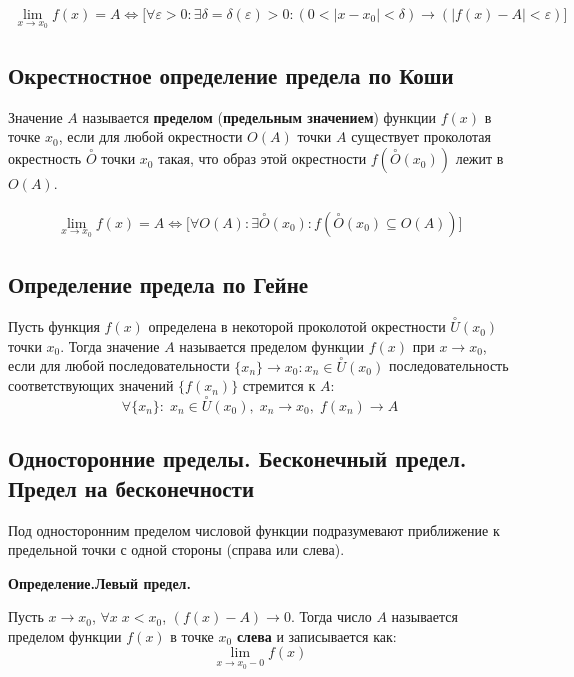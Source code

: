 \documentclass[a4paper,12pt,oneside]{extbook}
\newcommand{\newpar}{$ $\par\nobreak\ignorespaces}
\newenvironment{definition}[1][]{\noindent\textbf{Определение.\if\relax\detokenize{#1}\relax\else\;#1.\fi}\newpar}{\bigskip}
\theoremstyle{numbered}
\theoremstyle{unnumbered}
\theoremstyle{named}
\theoremstyle{unnumbered}
\theoremstyle{named}
\theoremstyle{named}
\theoremstyle{named}
\begin{document}
\begin{gather*}
    \lim_{x \to x_0}{f(x)} = A \iff \Big[ \forall \varepsilon > 0: \exists \delta = \delta (\varepsilon) > 0: (0 < |x - x_0| < \delta) \to (|f(x) - A| < \varepsilon) \Big]
\end{gather*}

\subsection{Окрестностное определение предела по Коши}
Значение \(A\) называется \textbf{пределом} (\textbf{предельным значением}) функции \(f(x)\) в точке \(x_0\), если для любой окрестности \(O(A)\) точки \(A\) существует проколотая окрестность \(\overset{\circ}{O}\) точки \(x_0\) такая, что образ этой окрестности \(f(\overset{\circ}{O}(x_0))\) лежит в \(O(A)\).

\begin{gather*}
    \lim_{x \to x_0}{f(x)} = A \iff \Big[ \forall O(A): \exists \overset{\circ}{O}(x_0): f(\overset{\circ}{O}(x_0) \subseteq O(A)) \Big]
\end{gather*}

\subsection{Определение предела по Гейне}%
\label{sub:Определение предела по Гейне}
Пусть функция \(f(x)\) определена в некоторой проколотой окрестности \(\overset{\circ}{U}(x_0)\) точки \(x_0\). Тогда значение \(A\) называется пределом функции \(f(x)\) при \(x \to x_0\), если для любой последовательности \(\{x_n\} \to x_0: x_n \in \overset{\circ}{U}(x_0)\) последовательность соответствующих значений \(\{f(x_n)\}\) стремится к \(A\):
\[
    \forall \{x_n\}:\; x_n \in \overset{\circ}{U}(x_0),\; x_n \to x_0,\; f(x_n) \to A
\]

\subsection{Односторонние пределы. Бесконечный предел. Предел на бесконечности}%
\label{sub:Односторонние пределы. Бесконечный предел. Предел на бесконечности}

\begin{siderules}
    Под односторонним пределом числовой функции подразумевают приближение к предельной точки с одной стороны (справа или слева).
\end{siderules}

\begin{definition}[Левый предел]
    Пусть \(x \to x_0\), \(\forall x \; x < x_0\), \((f(x) - A) \to 0\). Тогда число \(A\) называется пределом функции \(f(x)\) в точке \(x_0\) \textbf{слева} и записывается как:
    \[
        \lim_{x \to x_0 - 0}{f(x)}
    \]
\end{definition}
\end{document}
